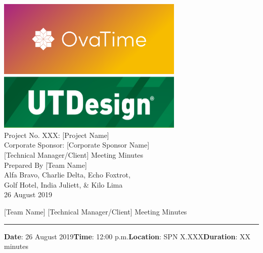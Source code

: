 \documentclass[12pt]{article}
\newcommand{\Title}{[Technical Manager/Client] Meeting Minutes}
\newcommand{\Date}{26 August 2019}
\newcommand{\Time}{12:00 p.m.}
\newcommand{\Location}{SPN X.XXX}
\newcommand{\Duration}{XX minutes}
\begin{document}
\thispagestyle{empty}
\begin{center}
    \includegraphics[width=3.5in]{logos/team_logo.png} \\
    \vspace{6pt}
    \includegraphics[width=3.5in]{logos/utdesign_logo.png} \\
    \vspace{0.75in}
    \Large
    Project No. XXX: [Project Name] \\
    Corporate Sponsor: [Corporate Sponsor Name] \\
    \vspace{0.75in}
    \Huge \Title \\
    \vspace{0.75in}
    \Large Prepared By [Team Name] \\
    \vspace{12pt}
    \large Alfa Bravo, Charlie Delta, Echo Foxtrot,\\ Golf Hotel, India Juliett, \& Kilo Lima \\
    \vspace{0.5in}
    \Large \Date \\
\end{center}
\clearpage

\begin{center}
    {\Large [Team Name] \Title}
\end{center}
\hrule
\vspace{18pt}
\textbf{Date}: \Date \hfill \textbf{Time}: \Time \hfill \textbf{Location}: \Location \hfill \textbf{Duration}: \Duration
\end{document}

